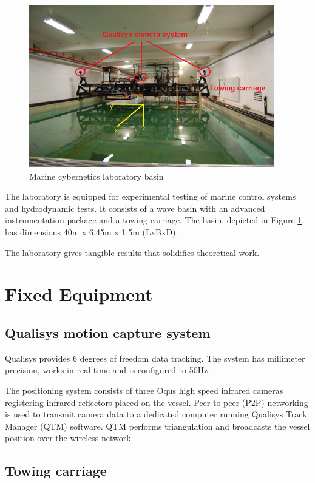 \documentclass[a4paper,twoside,english]{report}
\begin{document}
\begin{figure}
\centering \includegraphics[width=0.95\textwidth]{fig/mc_lab} 
\caption{Marine cybernetics laboratory basin}
\label{fig: Marine cybernetics laboratory basin-1}
\end{figure}

The laboratory is equipped for experimental testing of marine control
systems and hydrodynamic tests. It consists of a wave basin with an
advanced instrumentation package and a towing carriage. The basin,
depicted in Figure \ref{fig: Marine cybernetics laboratory basin-1},
has dimensions 40m x 6.45m x 1.5m (LxBxD).

The laboratory gives tangible results that solidifies theoretical
work. 
\clearpage{}

\section{Fixed Equipment}

\subsection{Qualisys motion capture system}
Qualisys provides 6 degrees of freedom data tracking. The system has millimeter precision, works in real time and is configured to 50Hz.

The positioning system consists of three Oqus high speed infrared cameras registering infrared reflectors placed on the vessel. Peer-to-peer (P2P) networking is used to transmit camera data to a dedicated computer running Qualisys Track Manager (QTM) software. QTM performs triangulation and broadcasts the vessel position over the wireless network.

\subsection{Towing carriage}
\end{document}
